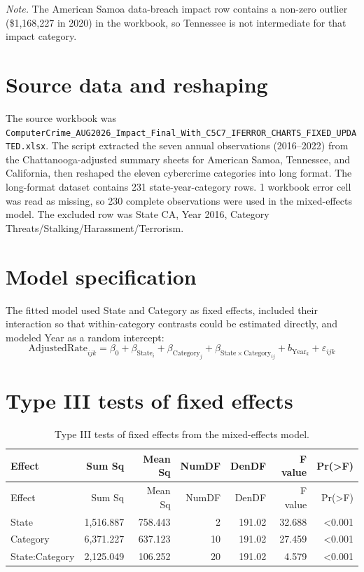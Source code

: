 \noindent\textit{Note.} The American Samoa data-breach impact row contains a non-zero outlier (\$1{,}168{,}227 in 2020) in the workbook, so Tennessee is not intermediate for that impact category.

\section{Source data and reshaping}
The source workbook was \texttt{ComputerCrime\_AUG2026\_Impact\_Final\_With\_C5C7\_IFERROR\_CHARTS\_FIXED\_UPDATED.xlsx}. The script extracted the seven annual observations (2016--2022) from the Chattanooga-adjusted summary sheets for American Samoa, Tennessee, and California, then reshaped the eleven \gls{cybercrime} categories into long format.
The long-format \gls{dataset} contains 231 state-year-category rows. 1 workbook error cell was read as missing, so 230 complete observations were used in the mixed-effects model.
The excluded row was State CA, Year 2016, Category Threats\slash Stalking\slash Harassment\slash Terrorism.
\section{Model specification}
The fitted model used State and Category as fixed effects, included their interaction so that within-category contrasts could be estimated directly, and modeled Year as a random intercept:
\[
\mathrm{AdjustedRate}_{ijk} = \beta_0 + \beta_{\mathrm{State}_i} + \beta_{\mathrm{Category}_j} + \beta_{\mathrm{State}\times\mathrm{Category}_{ij}} + b_{\mathrm{Year}_k} + \varepsilon_{ijk}
\]
\section{Type III tests of fixed effects}
\begin{longtable}{lrrrrrr}
\caption{Type III tests of fixed effects from the mixed-effects model.}\label{tab:type3}\\
\toprule
Effect & Sum Sq & Mean Sq & NumDF & DenDF & F value & Pr(>F) \\
\midrule
\endfirsthead
\toprule
Effect & Sum Sq & Mean Sq & NumDF & DenDF & F value & Pr(>F) \\
\midrule
\endhead
State & 1,516.887 & 758.443 & 2 & 191.02 & 32.688 & <0.001 \\
Category & 6,371.227 & 637.123 & 10 & 191.02 & 27.459 & <0.001 \\
State:Category & 2,125.049 & 106.252 & 20 & 191.02 & 4.579 & <0.001 \\
\bottomrule
\end{longtable}
